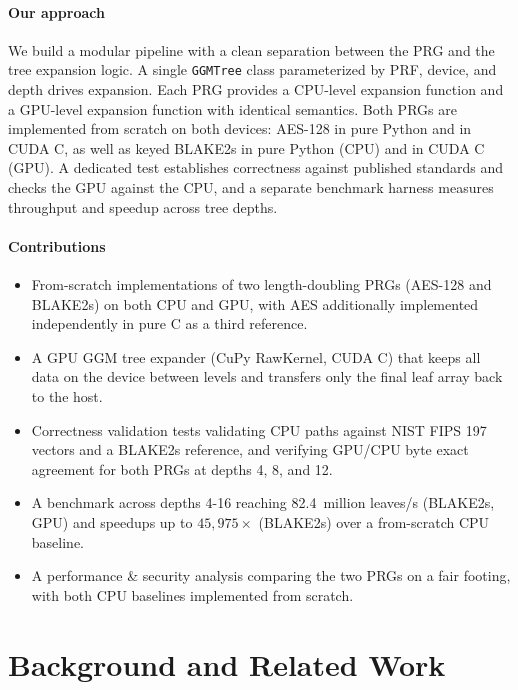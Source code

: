 \documentclass[conference]{IEEEtran}
\begin{document}
\paragraph{Our approach}
We build a modular pipeline with a clean separation between the PRG and the tree expansion logic. A single \texttt{GGMTree} class parameterized by PRF, device, and depth drives expansion. Each PRG provides a CPU-level expansion function and a GPU-level expansion function with identical semantics. Both PRGs are implemented from scratch on both devices: AES-128 in pure Python and in CUDA C, as well as keyed BLAKE2s in pure Python (CPU) and in CUDA C (GPU). A dedicated test establishes correctness against published standards and checks the GPU against the CPU, and a separate benchmark harness measures throughput and speedup across tree depths.

\paragraph{Contributions}
\begin{itemize}
\item From-scratch implementations of two length-doubling PRGs (AES-128 and BLAKE2s) on both CPU and GPU, with AES additionally implemented independently in pure C as a third reference.
\item A GPU GGM tree expander (CuPy RawKernel, CUDA C) that keeps all data on the device between levels and transfers only the final leaf array back to the host.
\item Correctness validation tests validating CPU paths against NIST FIPS 197 vectors and a BLAKE2s reference, and verifying GPU/CPU byte exact agreement for both PRGs at depths 4, 8, and 12.
\item A benchmark across depths 4-16 reaching 82.4~million leaves/s (BLAKE2s, GPU) and speedups up to $45{,}975\times$ (BLAKE2s) over a from-scratch CPU baseline.
\item A performance \& security analysis comparing the two PRGs on a fair footing, with both CPU baselines implemented from scratch.
\end{itemize}

\section{Background and Related Work}
\end{document}
